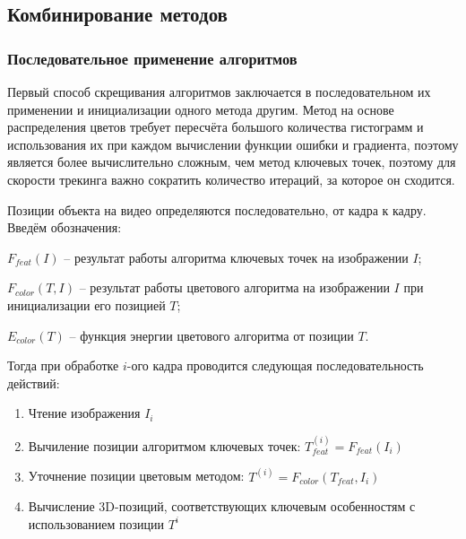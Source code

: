 \subsection{Комбинирование методов}


\subsubsection{Последовательное применение алгоритмов}


Первый способ скрещивания алгоритмов заключается в последовательном их
применении и инициализации одного метода другим.
Метод на основе распределения цветов требует пересчёта большого количества
гистограмм и использования их при каждом вычислении функции ошибки и градиента,
поэтому является более вычислительно сложным, чем метод ключевых точек, поэтому
для скорости трекинга важно сократить количество итераций, за которое он
сходится.

Позиции объекта на видео определяются последовательно, от кадра к кадру.
Введём обозначения:

$F_{feat}(I)$ -- результат работы алгоритма ключевых точек на изображении $I$; 

$F_{color}(T, I)$ -- результат работы цветового алгоритма на изображении $I$
при инициализации его позицией $T$;

$E_{color}(T)$ -- функция энергии цветового алгоритма от позиции $T$.

Тогда при обработке $i$-ого кадра проводится следующая последовательность
действий:

\begin{enumerate}
\item Чтение изображения $I_i$
\item Вычиление позиции алгоритмом ключевых точек:
    $T_{feat}^{(i)} = F_{feat}(I_i)$
\item Уточнение позиции цветовым методом:
    $T^{(i)} = F_{color}(T_{feat}, I_i)$
\item Вычисление  3D-позиций, соответствующих ключевым особенностям с
    использованием позиции $T^i$
\end{enumerate}

